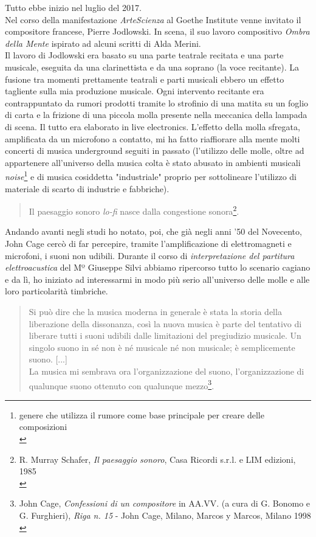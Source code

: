 Tutto ebbe inizio nel luglio del 2017. \\
Nel corso della manifestazione \textit{ArteScienza} al Goethe Institute venne invitato il compositore francese, Pierre Jodlowski. In scena, il suo lavoro compositivo \textit{Ombra della Mente} ispirato ad alcuni scritti di Alda Merini. \\
Il lavoro di Jodlowski era basato su una parte teatrale recitata e una parte musicale, eseguita da una clarinettista e da una soprano (la voce recitante). La fusione tra momenti prettamente teatrali e parti musicali ebbero un effetto tagliente sulla mia produzione musicale. Ogni intervento recitante era contrappuntato da rumori prodotti tramite lo strofinio di una matita su un foglio di carta e la frizione di una piccola molla presente nella meccanica della lampada di scena. Il tutto era elaborato in live electronics. L'effetto della molla sfregata, amplificata da un microfono a contatto, mi ha fatto riaffiorare alla mente molti concerti di musica underground seguiti in passato (l'utilizzo delle molle, oltre ad appartenere all'universo della musica colta è stato abusato in ambienti musicali \textit{noise}\footnote{genere che utilizza il rumore come base principale per creare delle composizioni \\} e di musica cosiddetta "industriale" proprio per sottolineare l'utilizzo di materiale di scarto di industrie e fabbriche).
\begin{quotation}
Il paesaggio sonoro \textit{lo-fi} nasce dalla congestione sonora\footnote{R. Murray Schafer, \textit{Il paesaggio sonoro}, Casa Ricordi s.r.l. e LIM edizioni, 1985 \\}.
\end{quotation}
Andando avanti negli studi ho notato, poi, che già negli anni '50 del Novecento, John Cage cercò di far percepire, tramite l'amplificazione di elettromagneti e microfoni, i suoni non udibili. Durante il corso di \textit{interpretazione del partitura elettroacustica} del Mº Giuseppe Silvi abbiamo ripercorso tutto lo scenario cagiano e da lì, ho iniziato ad interessarmi in modo più serio all'universo delle molle e alle loro particolarità timbriche.
\begin{small}
\begin{quotation}
Si può dire che la musica moderna in generale è stata la storia della liberazione della dissonanza, così la nuova musica è parte del tentativo di liberare tutti i suoni udibili dalle limitazioni del pregiudizio musicale.
Un singolo suono in sé non è né musicale né non musicale; è semplicemente suono. [...] \\
La musica mi sembrava ora l'organizzazione del suono, l'organizzazione di qualunque suono ottenuto con qualunque mezzo\footnote{John Cage, \textit{Confessioni di un compositore} in AA.VV. (a cura di G. Bonomo e G. Furghieri), \textit{Riga n. 15} - John Cage, Milano, Marcos y Marcos, Milano 1998 \\}.
\end{quotation}
\end{small}
